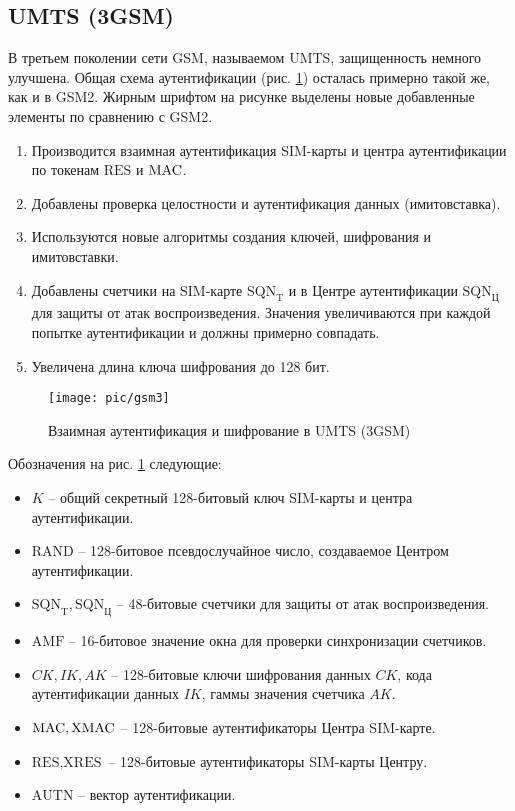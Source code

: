 \subsection{UMTS (3GSM)}

В третьем поколении сети GSM, называемом UMTS, защищенность немного улучшена. Общая схема аутентификации (рис. \ref{fig:gsm3}) осталась примерно такой же, как и в GSM2. Жирным шрифтом на рисунке выделены новые добавленные элементы по сравнению с GSM2.
\begin{enumerate}
    \item Производится взаимная аутентификация SIM-карты и центра аутентификации по токенам $\textrm{RES}$ и $\textrm{MAC}$.
    \item Добавлены проверка целостности и аутентификация данных (имитовставка).
    \item Используются новые алгоритмы создания ключей, шифрования и имитовставки.
    \item Добавлены счетчики на SIM-карте $\textrm{SQN}_\textrm{T}$ и в Центре аутентификации $\textrm{SQN}_\textrm{Ц}$ для защиты от атак воспроизведения. Значения увеличиваются при каждой попытке аутентификации и должны примерно совпадать.
    \item Увеличена длина ключа шифрования до 128 бит.
\end{enumerate}

\begin{figure}[h!]
	\centering
	\texttt{[image: pic/gsm3]}
	\caption{Взаимная аутентификация и шифрование в UMTS (3GSM)\label{fig:gsm3}}
\end{figure}

Обозначения на рис. \ref{fig:gsm3} следующие:
\begin{itemize}
    \item $K$ -- общий секретный 128-битовый ключ SIM-карты и центра аутентификации.
    \item $\textrm{RAND}$ -- 128-битовое псевдослучайное число, создаваемое Центром аутентификации.
    \item $\textrm{SQN}_\textrm{T}, \textrm{SQN}_\textrm{Ц}$ -- 48-битовые счетчики для защиты от атак воспроизведения.
    \item $\textrm{AMF}$ -- 16-битовое значение окна для проверки синхронизации счетчиков.
    \item $CK, IK, AK$ -- 128-битовые ключи шифрования данных $CK$, кода аутентификации данных $IK$, гаммы значения счетчика $AK$.
    \item $\textrm{MAC}, \textrm{XMAC}$ -- 128-битовые аутентификаторы Центра SIM-карте.
    \item $\textrm{RES}, \textrm{XRES}$ -- 128-битовые аутентификаторы SIM-карты Центру.
    \item $\textrm{AUTN}$ -- вектор аутентификации.
\end{itemize}

